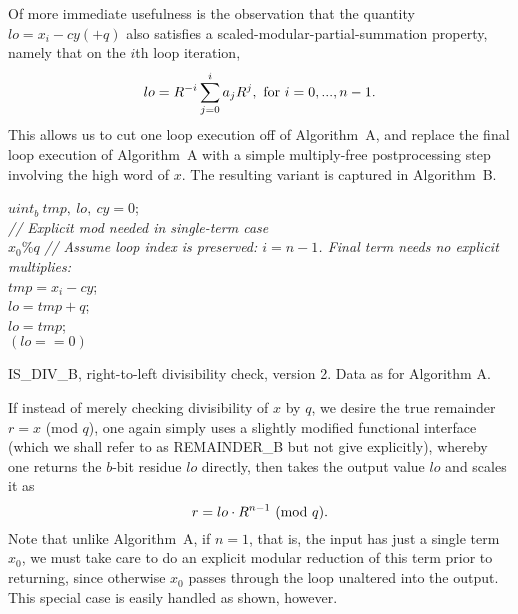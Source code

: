 \documentclass{article}
\begin{document}
Of more immediate usefulness is the observation that the quantity $lo = x_i - cy (+ q)$ also satisfies a scaled-modular-partial-summation property, namely that on the $i$th loop iteration,
\begin{equation}
	lo = R^{-i} \sum_{j=0}^{i} a_j R^j ,\ {\rm for}\ i = 0, ... , n-1.
\label{Bsum}
\end{equation}
This allows us to cut one loop execution off of Algorithm~A, and replace the final loop execution of Algorithm~A with a simple multiply-free postprocessing step involving the high word of $x$. The resulting variant is captured in Algorithm~B.
\\
\begin{algorithm}\SetAlgoLined
{}
\vspace{0.1in}
{
	$uint_b\ tmp,\ lo,\ cy = 0$;\\
	 {	{\em// Explicit mod needed in single-term case}\\
		\Return $x_0 \% q$\;
	}
	{\em // Assume loop index is preserved: $i = n-1$. Final term needs no explicit multiplies:}\\
	$tmp  = x_i - cy$;\\
	 {
		$lo = tmp + q$;\\
	}{
		$lo = tmp$;\\
	}
	\Return $(lo == 0)$\;
}
\caption{IS\_DIV\_B, right-to-left divisibility check, version 2. Data as for Algorithm A.}
\label{algo_b}
\end{algorithm}

If instead of merely checking divisibility of $x$ by $q$, we desire  the true remainder $r = x$ (mod $q$), one again simply uses a slightly modified functional interface (which we shall refer to as REMAINDER\_B but not give explicitly), whereby one returns the $b$-bit residue $lo$ directly, then takes the output value $lo$ and scales it as
$$
	r = lo \cdot R^{n-1} \ ({\rm mod}\ q).
$$
Note that unlike Algorithm~A, if $n = 1$, that is, the input has just a single term $x_0$, we must take care to do an explicit modular reduction of this term prior to returning, since otherwise $x_0$ passes through the loop unaltered into the output. This special case is easily handled as shown, however.
\end{document}

